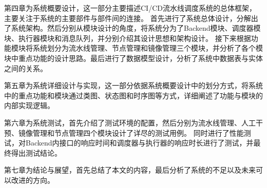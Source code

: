 第四章为系统概要设计，这一部分主要描述CI/CD流水线调度系统的总体框架，主要关注于系统的主要部件与部件间的连接。
首先进行了系统总体设计，分解出了系统架构。然后分别从模块设计的角度，将系统分为了Backend模块、调度器模块、执行器模块和消息队列，并分别介绍其设计思想和架构设计。
接下来根据功能模块将系统划分为流水线管理、节点管理和镜像管理三个模块，并分析了各个模块中重点功能的设计思路。最后进行了数据模型设计，分析了系统中数据表与实体之间的关系。

第五章为系统详细设计与实现，这一部分依据系统概要设计中的划分方式，将系统中的重点功能和模块通过类图、状态图和时序图等方式，详细阐述了功能与模块的内部实现逻辑。

第六章为系统测试，首先介绍了测试环境的配置，然后分别为流水线管理、人工干预、镜像管理和节点管理四个模块设计了详尽的测试用例。
同时进行了性能测试，对Backend内接口的响应时间和调度器与执行器的响应时长进行了测试，并最终得出测试结论。

第七章为结论与展望，首先总结了本文的内容，最后分析了系统的不足以及未来可以改进的方向。